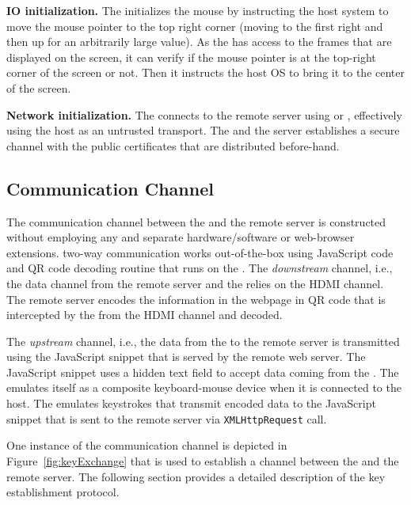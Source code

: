 \begin{mylist}
  \item\textbf{IO initialization.} The \device initializes the mouse by instructing the host system to move the mouse pointer to the top right corner (moving to the first right and then up for an arbitrarily large value). As the \device has access to the frames that are displayed on the screen, it can verify if the mouse pointer is at the top-right corner of the screen or not. Then it instructs the host OS to bring it to the center of the screen.
  
  \item\textbf{Network initialization.} The \device connects to the remote server using \webusb or \webbt, effectively using the host as an untrusted transport. The \device and the server establishes a secure channel with the public certificates that are distributed before-hand.
\end{mylist}
\fi

\subsection{Communication Channel}
\label{sec:systemDesign:communicationChannel}

The communication channel between the \device and the remote server is constructed without employing any and separate hardware/software or web-browser extensions. \name two-way communication works out-of-the-box using JavaScript code and QR code decoding routine that runs on the \device. The \emph{downstream} channel, i.e., the data channel from the remote server and the \device relies on the HDMI channel. The remote server encodes the information in the webpage in QR code that is intercepted by the \device from the HDMI channel and decoded.

The \emph{upstream} channel, i.e., the data from the \device to the remote server is transmitted using the \name JavaScript snippet that is served by the remote web server. The \name JavaScript snippet uses a hidden text field to accept data coming from the \device. The \device emulates itself as a composite keyboard-mouse device when it is connected to the host. The \device emulates keystrokes that transmit encoded data to the \name JavaScript snippet that is sent to the remote server via \texttt{XMLHttpRequest} call.

One instance of the communication channel is depicted in Figure~\ref{fig:keyExchange} that is used to establish a \tls channel between the \device and the remote server. The following section provides a detailed description of the key establishment protocol.


